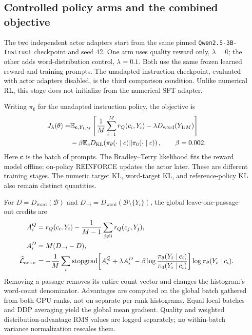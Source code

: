 \subsection{Controlled policy arms and the combined objective}
The two independent actor adapters start from the same pinned
\texttt{Qwen2.5-3B-Instruct} checkpoint and seed 42. One arm uses quality
reward only, $\lambda=0$; the other adds word-distribution control,
$\lambda=0.1$. Both use the same frozen learned reward and training
prompts. The unadapted instruction checkpoint, evaluated with actor
adapters disabled, is the third comparison condition. Unlike numerical
RL, this stage does not initialize from the numerical SFT adapter.

Writing $\pi_0$ for the unadapted instruction policy, the objective is
\begin{align}
 J_\lambda(\theta)=
 &\mathbb{E}_{\mathbf c,Y_{1:M}}
 \left[\frac1M\sum_{i=1}^{M}r_Q(c_i,Y_i)
                    -\lambda D_{\mathrm{word}}(Y_{1:M})\right]\nonumber\\
 &-\beta\mathbb{E}_cD_{\mathrm{KL}}\!\left(\pi_\theta(\cdot\mid c)
                         \Vert\pi_0(\cdot\mid c)\right),
 \qquad \beta=0.002.
 \label{eq:helpsteerobjective}
\end{align}
Here $\mathbf c$ is the batch of prompts. The Bradley--Terry likelihood
fits the reward model offline; on-policy REINFORCE updates the actor
later. These are different training stages. The numeric target KL,
word-target KL, and reference-policy KL also remain distinct quantities.

For $D=D_{\mathrm{word}}(\mathcal B)$ and
$D_{-i}=D_{\mathrm{word}}(\mathcal B\setminus\{Y_i\})$, the global
leave-one-passage-out credits are
\begin{align}
 A_i^Q&=r_Q(c_i,Y_i)-\frac{1}{M-1}\sum_{j\ne i}r_Q(c_j,Y_j),\\
 A_i^D&=M(D_{-i}-D),\\
 \widehat{\mathcal L}_{\mathrm{actor}}&=
 -\frac1M\sum_i\operatorname{stopgrad}\!\left[A_i^Q+\lambda A_i^D
       -\beta\log\frac{\pi_\theta(Y_i\mid c_i)}{\pi_0(Y_i\mid c_i)}\right]
       \log\pi_\theta(Y_i\mid c_i).
 \label{eq:helpsteersurrogate}
\end{align}
Removing a passage removes its entire count vector and changes the
histogram's word-count denominator. Advantages are computed on the
global batch gathered from both GPU ranks, not on separate per-rank
histograms. Equal local batches and DDP averaging yield the global mean
gradient. Quality and weighted distribution-advantage RMS values are
logged separately; no within-batch variance normalization rescales them.

